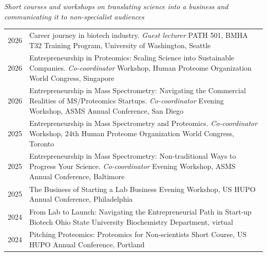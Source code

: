 \documentclass[11pt]{article}
\begin{document}
\textit{Short courses and workshops on translating science into a business and
communicating it to non-specialist audiences}
\newline \\

\begin{longtable}{V}
  2026 & Career journey in biotech industry. \textit{Guest lecturer}
    \newline PATH 501, BMHA T32 Training Program, University of Washington, Seattle \\
  2026 & Entrepreneurship in Proteomics: Scaling Science into Sustainable
    Companies. \textit{Co-coordinator}
    \newline Workshop, Human Proteome Organization World Congress, Singapore \\
  2026 & Entrepreneurship in Mass Spectrometry: Navigating the Commercial
    Realities of MS/Proteomics Startups. \textit{Co-coordinator}
    \newline Evening Workshop, ASMS Annual Conference, San Diego \\
  2025 & Entrepreneurship in Mass Spectrometry and Proteomics. \textit{Co-coordinator}
    \newline Workshop, 24th Human Proteome Organization World Congress,
    Toronto \\
  2025 & Entrepreneurship in Mass Spectrometry: Non-traditional Ways to
    Progress Your Science. \textit{Co-coordinator}
    \newline Evening Workshop, ASMS Annual Conference, Baltimore \\
  2025 & The Business of Starting a Lab Business
    \newline Evening Workshop, US HUPO Annual Conference, Philadelphia \\
  2024 & From Lab to Launch: Navigating the Entrepreneurial Path in Start-up Biotech
    \newline Ohio State University Biochemistry Department, virtual \\
  2024 & Pitching Proteomics: Proteomics for Non-scientists
    \newline Short Course, US HUPO Annual Conference, Portland \\
\end{longtable}
\end{document}
